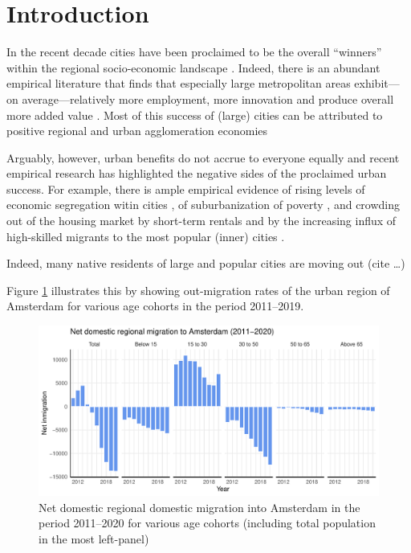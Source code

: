 \documentclass[11pt,parskip,abstracton,notitlepage, dvipsnames]{scrartcl}
\begin{document}
	\newpage

\section{Introduction}\label{Introduction}

In the recent decade cities have been proclaimed to be the overall ``winners''
within the regional socio-economic landscape \citep[]{glaeser2012triumph}.
Indeed, there is an abundant empirical literature that finds that especially
large metropolitan areas exhibit---on average---relatively more employment, more
innovation and produce overall more added value \citep[see,
e.g.,][]{balland2020complex}. Most of this success of (large) cities can be
attributed to positive regional and urban agglomeration economies \citep[see for
recent overviews of the size, scope and nature of these urban
economies][]{melo2009meta, duranton2020, rosenthal2020}

Arguably, however, urban benefits do not accrue to everyone equally and recent
empirical research has highlighted the negative sides of the proclaimed urban
success. For example, there is ample empirical evidence of rising levels of
economic segregation witin cities \citep{tammaru2015socio}, of suburbanization
of poverty \citep{hochstenbach2018gentrification}, and crowding out of the
housing market by short-term rentals \citep{koster2018short} and by the
increasing influx of high-skilled migrants to the most popular (inner) cities
\citep{beckers2019residential}.

Indeed, many native residents of large and popular cities are moving out (cite \dots)

Figure \ref{fig:adam_mig} illustrates this by showing out-migration rates of the
urban region of Amsterdam for
various age cohorts in the period 2011--2019. 

\begin{figure}[h!]\centering %
 \includegraphics[width=1\linewidth]{../../fig/outmig_amsterdam.pdf}
 \caption{Net domestic regional domestic migration into Amsterdam in the period 2011--2020 for
   various age cohorts (including total population in the most left-panel)}
  \label{fig:adam_mig}
\end{figure}
\end{document}
